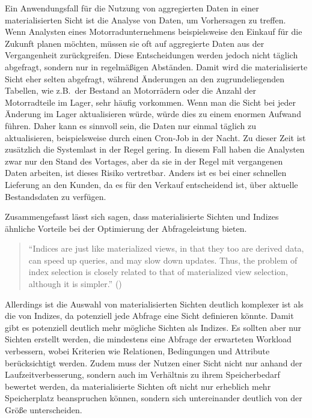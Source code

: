 Ein Anwendungsfall für die Nutzung von aggregierten Daten in einer materialisierten Sicht ist die Analyse von Daten, um Vorhersagen zu treffen.
Wenn Analysten eines Motorradunternehmens beispielsweise den Einkauf für die Zukunft planen möchten, müssen sie oft auf aggregierte Daten aus der Vergangenheit zurückgreifen.
Diese Entscheidungen werden jedoch nicht täglich abgefragt, sondern nur in regelmäßigen Abständen.
Damit wird die materialisierte Sicht eher selten abgefragt, während Änderungen an den zugrundeliegenden Tabellen, wie z.B.\ der Bestand an Motorrädern oder die Anzahl der Motorradteile im Lager, sehr häufig vorkommen.
Wenn man die Sicht bei jeder Änderung im Lager aktualisieren würde, würde dies zu einem enormen Aufwand führen.
Daher kann es sinnvoll sein, die Daten nur einmal täglich zu aktualisieren, beispielsweise durch einen Cron-Job in der Nacht.
Zu dieser Zeit ist zusätzlich die Systemlast in der Regel gering.
In diesem Fall haben die Analysten zwar nur den Stand des Vortages, aber da sie in der Regel mit vergangenen Daten arbeiten, ist dieses Risiko vertretbar.
Anders ist es bei einer schnellen Lieferung an den Kunden, da es für den Verkauf entscheidend ist, über aktuelle Bestandsdaten zu verfügen.

Zusammengefasst lässt sich sagen, dass materialisierte Sichten und Indizes ähnliche Vorteile bei der Optimierung der Abfrageleistung bieten.

\begin{quote}
    \enquote{Indices are just like materialized views, in that they too are derived data, can speed up queries, and may slow down updates. Thus, the problem of index selection is closely related to that of materialized view selection, although it is simpler.} (\cite[S. 613]{silberschatz2011database})
\end{quote}

Allerdings ist die Auswahl von materialisierten Sichten deutlich komplexer ist als die von Indizes, da potenziell jede Abfrage eine Sicht definieren könnte.
Damit gibt es potenziell deutlich mehr mögliche Sichten als Indizes.
Es sollten aber nur Sichten erstellt werden, die mindestens eine Abfrage der erwarteten Workload verbessern, wobei Kriterien wie Relationen, Bedingungen und Attribute berücksichtigt werden.
Zudem muss der Nutzen einer Sicht nicht nur anhand der Laufzeitverbesserung, sondern auch im Verhältnis zu ihrem Speicherbedarf bewertet werden, da materialisierte Sichten oft nicht nur erheblich mehr Speicherplatz beanspruchen können, sondern sich untereinander deutlich von der Größe unterscheiden.

